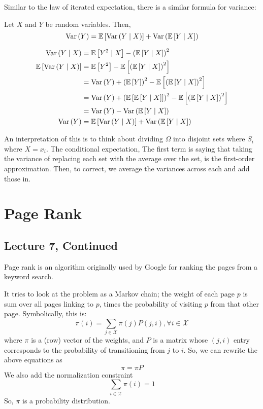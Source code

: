 Similar to the law of iterated expectation, there is a similar formula for variance:
\begin{theorem} 
    Let $X$ and $Y$ be random variables. Then,
    \[ \text{Var}\left( Y \right) = \mathbb{E}\left[ \text{Var}\left( Y \mid X \right) \right] + \text{Var}\left( \mathbb{E}\left[ Y \mid X \right] \right) \]

    \begin{proof*}
        \begin{align*}
            \text{Var}\left( Y \mid X \right) &= \mathbb{E}\left[ Y^2 \mid X \right] - \qty(\mathbb{E}\left[ Y \mid X \right])^2 \\
            \mathbb{E}\left[ \text{Var}\left( Y \mid X \right) \right] &= \mathbb{E}\left[ Y^2 \right] - \mathbb{E}\left[ \qty(\mathbb{E}\left[ Y \mid X \right])^2 \right] \\
            &= \text{Var}\left( Y \right) + \qty(\mathbb{E}\left[ Y \right])^2 -\mathbb{E}\left[ \qty(\mathbb{E}\left[ Y \mid X \right])^2 \right] \\
            &= \text{Var}\left( Y \right) + \qty(\mathbb{E}\left[ \mathbb{E}\left[ Y \mid X \right] \right])^2 - \mathbb{E}\left[ \qty(\mathbb{E}\left[ Y \mid X \right])^2 \right] \\
            &= \text{Var}\left( Y \right) - \text{Var}\left( \mathbb{E}\left[ Y \mid X \right] \right) \\
            \text{Var}\left( Y \right) &= \mathbb{E}\left[ \text{Var}\left( Y \mid X \right) \right] + \text{Var}\left( \mathbb{E}\left[ Y \mid X \right] \right)
        \end{align*}
    \end{proof*}
\end{theorem}

An interpretation of this is to think about dividing $\Omega$ into disjoint sets where $S_i$ where $X = x_i$.
The conditional expectation, The first term is saying that taking the variance of replacing each set with the average over the set,
is the first-order
approximation. Then, to correct, we average the variances across each and add those in.

\section{Page Rank}

\subsection{Lecture 7, Continued}

Page rank is an algorithm originally used by Google for ranking the pages from a keyword search.

It tries to look at the problem as a Markov chain;
the weight of each page $p$ is sum over all pages linking to $p$, times
the probability of visiting $p$ from that other page. Symbolically, this is:
\[ \pi(i) = \sum_{j \in \mathcal{X}} \pi(j) P(j, i), \forall i \in \mathcal{X} \]
where $\pi$ is a (row) vector of the weights, and $P$ is a matrix whose $(j, i)$ entry
corresponds to the probability of transitioning from $j$ to $i$. So, we can rewrite the above equations
as
\[ \pi = \pi P \]
We also add the normalization constraint
\[ \sum_{i \in \mathcal{X}} \pi(i) = 1 \]
So, $\pi$ is a probability distribution.

